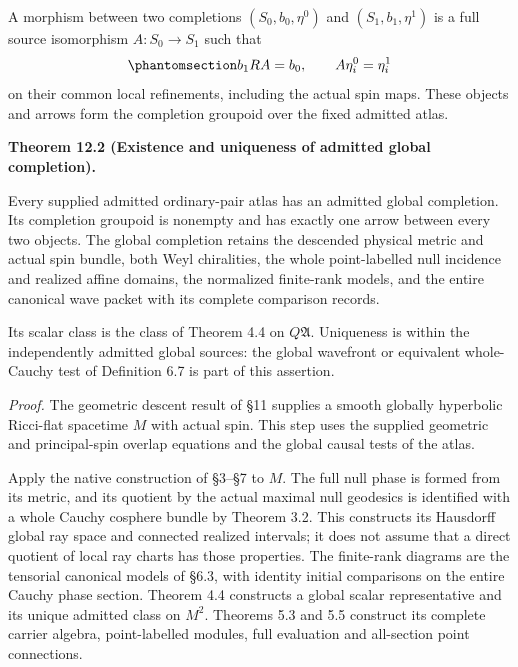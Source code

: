 \documentclass[
  english,
  11pt,
  reqno]{amsart}
\makeatletter
\newcounter{none} %
\newcommand{\pandocstatementheading}[1]{%
  \par\addpenalty{\@beginparpenalty}%
  \addvspace{.5\baselineskip plus .2\baselineskip minus .2\baselineskip}%
  {\normalfont\bfseries #1\par}%
  \nobreak\@afterindenttrue\@afterheading
}
\makeatother
\begin{document}
A morphism between two completions \((S_0,b_0,\eta^0)\) and
\((S_1,b_1,\eta^1)\) is a full source isomorphism \(A:S_0\to S_1\) such
that
\begin{equation}\protect\phantomsection\label{eq:ordinary-atlas-completion-arrow}{
b_1RA=b_0,
\qquad
A\eta_i^0=\eta_i^1
}\end{equation} on their common local refinements, including the actual
spin maps. These objects and arrows form the completion groupoid over
the fixed admitted atlas.

\pandocstatementheading{\protect{}\label{thm:ordinary-atlas-admitted-completion}Theorem 12.2 (Existence and uniqueness of admitted global completion).}

Every supplied admitted ordinary-pair atlas has an admitted global
completion. Its completion groupoid is nonempty and has exactly one
arrow between every two objects. The global completion retains the
descended physical metric and actual spin bundle, both Weyl chiralities,
the whole point-labelled null incidence and realized affine domains, the
normalized finite-rank models, and the entire canonical wave packet with
its complete comparison records.

Its scalar class is the class of Theorem 4.4 on \(Q\mathfrak A\).
Uniqueness is within the independently admitted global sources: the
global wavefront or equivalent whole-Cauchy test of Definition 6.7 is
part of this assertion.

\emph{Proof.} The geometric descent result of §11 supplies a smooth
globally hyperbolic Ricci-flat spacetime \(M\) with actual spin. This
step uses the supplied geometric and principal-spin overlap equations
and the global causal tests of the atlas.

Apply the native construction of §3--§7 to \(M\). The full null phase is
formed from its metric, and its quotient by the actual maximal null
geodesics is identified with a whole Cauchy cosphere bundle by Theorem
3.2. This constructs its Hausdorff global ray space and connected
realized intervals; it does not assume that a direct quotient of local
ray charts has those properties. The finite-rank diagrams are the
tensorial canonical models of §6.3, with identity initial comparisons on
the entire Cauchy phase section. Theorem 4.4 constructs a global scalar
representative and its unique admitted class on \(M^2\). Theorems 5.3
and 5.5 construct its complete carrier algebra, point-labelled modules,
full evaluation and all-section point connections.
\end{document}
